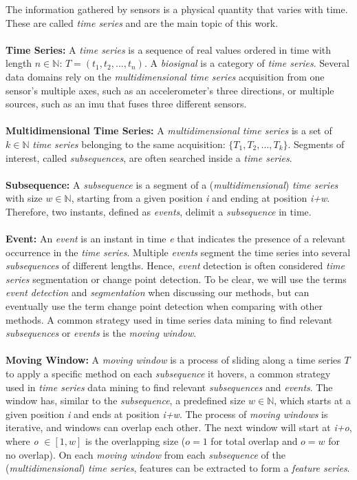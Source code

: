 The information gathered by sensors is a physical quantity that varies with time. These are called \textit{time series} and are the main topic of this work.\\\\
\textbf{Time Series:} A \textit{time series} is a sequence of real values ordered in time with length $n \in \mathbb{N}$: $T = (t_1, t_2, ..., t_n)$. A \textit{biosignal} is a category of \textit{time series}.
Several data domains rely on the \textit{multidimensional time series} acquisition from one sensor's multiple axes, such as an accelerometer's three directions, or multiple sources, such as an \gls{imu} that fuses three different sensors.\\\\
\textbf{Multidimensional Time Series:} A \textit{multidimensional time series} is a set of $k \in \mathbb{N}$ \textit{time series} belonging to the same acquisition: $\{T_1, T_2, ..., T_k\}$. Segments of interest, called \textit{subsequences}, are often searched inside a \textit{time series}.\\\\
\textbf{Subsequence:} A \textit{subsequence} is a segment of a (\textit{multidimensional}) \textit{time series} with size $w \in \mathbb{N}$, starting from a given position \textit{i} and ending at position \textit{i+w}. Therefore, two instants, defined as \textit{events}, delimit a \textit{subsequence} in time.\\\\
\textbf{Event:} An \textit{event} is an instant in time \textit{e} that indicates the presence of a relevant occurrence in the \textit{time series}. Multiple \textit{events} segment the time series into several \textit{subsequences} of different lengths. Hence, \textit{event} detection is often considered \textit{time series} segmentation or change point detection\cite{cpd_alan}. To be clear, we will use the terms \textit{event detection} and \textit{segmentation} when discussing our methods, but can eventually use the term change point detection when comparing with other methods. A common strategy used in time series data mining to find relevant \textit{subsequences} or \textit{events} is the \textit{moving window}.\\\\
\textbf{Moving Window:} A \textit{moving window} is a process of sliding along a time series $T$ to apply a specific method on each \textit{subsequence} it hovers, a common strategy used in \textit{time series} data mining to find relevant \textit{subsequences} and \textit{events}.
The window has, similar to the \textit{subsequence}, a predefined size $w \in \mathbb{N}$, which starts at a given position \textit{i} and ends at position \textit{i+w}.
The process of \textit{moving windows} is iterative, and windows can overlap each other. The next window will start at \textit{i+o}, where  \textit{o} $\in [1, w]$ is the overlapping size ($o=1$ for total overlap and $o=w$ for no overlap).
On each \textit{moving window} from each \textit{subsequence} of the (\textit{multidimensional}) \textit{time series}, features can be extracted to form a \textit{feature series}.

